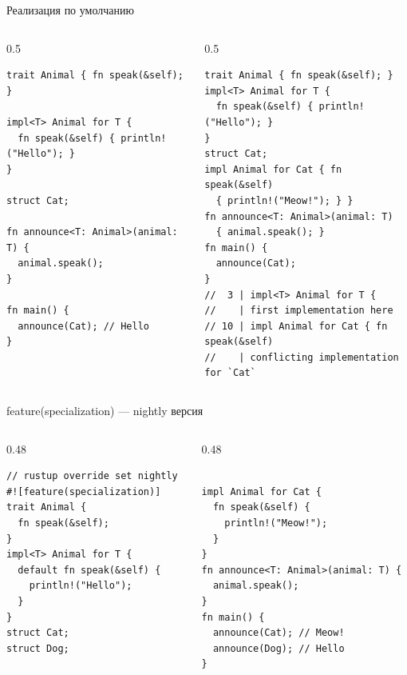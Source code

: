 \documentclass[aspectratio=169]{beamer}
\begin{document}
\begin{frame}[fragile]{Реализация по умолчанию}
  \begin{columns}[T, onlytextwidth]
    \setlength{\columnsep}{0pt}
    \begin{column}{0.5\textwidth}
      \begin{verbatim}
trait Animal { fn speak(&self); }

impl<T> Animal for T {
  fn speak(&self) { println!("Hello"); }
}

struct Cat;

fn announce<T: Animal>(animal: T) {
  animal.speak();
}

fn main() {
  announce(Cat); // Hello
}
      \end{verbatim}
    \end{column}
    \begin{column}{0.5\textwidth}
      \begin{verbatim}
trait Animal { fn speak(&self); }
impl<T> Animal for T {
  fn speak(&self) { println!("Hello"); }
}
struct Cat;
impl Animal for Cat { fn speak(&self)
  { println!("Meow!"); } }
fn announce<T: Animal>(animal: T)
  { animal.speak(); }
fn main() {
  announce(Cat);
}
//  3 | impl<T> Animal for T {
//    | first implementation here
// 10 | impl Animal for Cat { fn speak(&self)
//    | conflicting implementation for `Cat`
      \end{verbatim}
    \end{column}
  \end{columns}
\end{frame}


\begin{frame}[fragile]{feature(specialization) --- nightly версия}
  \begin{columns}[T]
    \begin{column}{0.48\textwidth}
      \begin{verbatim}
// rustup override set nightly
#![feature(specialization)]
trait Animal {
  fn speak(&self);
}
impl<T> Animal for T {
  default fn speak(&self) {
    println!("Hello");
  }
}
struct Cat;
struct Dog;

      \end{verbatim}
    \end{column}
    \begin{column}{0.48\textwidth}
      \begin{verbatim}

impl Animal for Cat {
  fn speak(&self) {
    println!("Meow!");
  }
}
fn announce<T: Animal>(animal: T) {
  animal.speak();
}
fn main() {
  announce(Cat); // Meow!
  announce(Dog); // Hello
}
      \end{verbatim}
    \end{column}
  \end{columns}
\end{frame}
\end{document}

